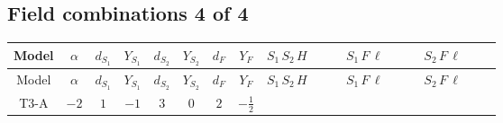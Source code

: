 \documentclass[8pt]{article}
\begin{document}
\begin{landscape}
\subsection*{Field combinations 4 of 4}
\begin{longtable}{@{}cccccccc >{\raggedright\arraybackslash}p{0.21\linewidth} >{\raggedright\arraybackslash}p{0.21\linewidth} >{\raggedright\arraybackslash}p{0.21\linewidth}@{}}
\toprule
Model & $\alpha$ & $d_{S_1}$ & $Y_{S_1}$ & $d_{S_2}$ & $Y_{S_2}$ & $d_F$ & $Y_F$ & $S_1\,S_2\,H$ & $S_1\,F\,\ell$ & $S_2\,F\,\ell$ \\
\midrule
\endfirsthead
\toprule
Model & $\alpha$ & $d_{S_1}$ & $Y_{S_1}$ & $d_{S_2}$ & $Y_{S_2}$ & $d_F$ & $Y_F$ & $S_1\,S_2\,H$ & $S_1\,F\,\ell$ & $S_2\,F\,\ell$ \\
\midrule
\endhead
T3-A & $-2$ & $1$ & $-1$ & $3$ & $0$ & $2$ & $-\frac{1}{2}$ & \scriptsize\adjustbox{max width=\linewidth}{$\begin{gathered} +\overline{\lambda_5} S_{2,j_1} {\mathcal{I}_{T3}}^{*}_{a_1,a_2,j_1} H_{a_1}{}^{\dagger } H_{a_2}{}^{\dagger } S_1{}^{\dagger } \\ +H_{a_1} H_{a_2} S_1 \mathcal{I}_{T3,a_1,a_2,j_1} \lambda_5 S_{2,j_1}{}^{\dagger }\end{gathered}$} & \scriptsize\adjustbox{max width=\linewidth}{$\begin{gathered} +\overline{L_{a_1,i_1}}\, C\, P_R\, \overline{F_{j_1,r_1}}{}^T S_1 y_{1,i_1,r_1} \mathcal{I}_{y_1,a_1,j_1} \\ +\overline{y_{1,i_1,r_1}} L_{a_1,i_1}{}^T\, C\, P_L\, F_{j_1,r_1} {\mathcal{I}_{y_1}}^{*}_{a_1,j_1} S_1{}^{\dagger }\end{gathered}$} & \scriptsize\adjustbox{max width=\linewidth}{$\begin{gathered} +\overline{y_{2,i_1,r_1}} \overline{F_{j_1,r_1}}\, P_L\, L_{a_1,i_1} S_{2,j_1} {\mathcal{I}_{y_2}}^{*}_{a_1,j_1,j_1} \\ +\overline{L_{a_1,i_1}}\, P_R\, F_{j_1,r_1} y_{2,i_1,r_1} \mathcal{I}_{y_2,a_1,j_1,j_1} S_{2,j_1}{}^{\dagger }\end{gathered}$} \\
\midrule

\end{longtable}
\end{landscape}
\end{document}
